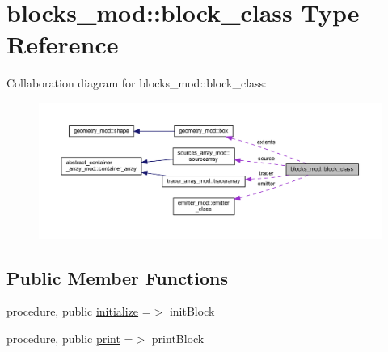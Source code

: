 \hypertarget{structblocks__mod_1_1block__class}{}\section{blocks\+\_\+mod\+:\+:block\+\_\+class Type Reference}
\label{structblocks__mod_1_1block__class}


Collaboration diagram for blocks\+\_\+mod\+:\+:block\+\_\+class\+:\nopagebreak
\begin{figure}[H]
\begin{center}
\leavevmode
\includegraphics[width=350pt]{structblocks__mod_1_1block__class__coll__graph}
\end{center}
\end{figure}
\subsection*{Public Member Functions}
\begin{DoxyCompactItemize}
\item 
procedure, public \hyperlink{structblocks__mod_1_1block__class_ad671745ca5dc3227ddb0ed1d9ff45268}{initialize} =$>$ init\+Block
\item 
procedure, public \hyperlink{structblocks__mod_1_1block__class_a43b4c133934eaadb55d30cf834d1e28c}{print} =$>$ print\+Block
\end{DoxyCompactItemize}
